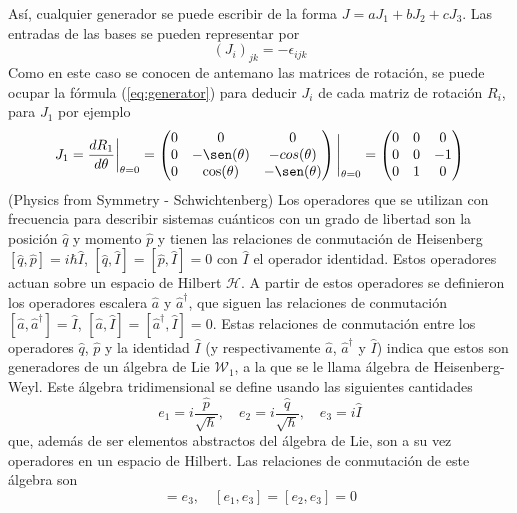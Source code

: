 Así, cualquier generador se puede escribir de la forma $J = aJ_1+ bJ_2+cJ_3$. Las entradas de las bases se pueden representar por
\begin{equation*}
  (J_i)_{jk} = -\epsilon_{ijk}
\end{equation*}
Como en este caso se conocen de antemano las matrices de rotación, se puede ocupar la fórmula (\ref{eq:generator}) para deducir $J_i$ de cada matriz de rotación $R_i$, para $J_1$ por ejemplo
\begin{equation*}
  J_1 = \frac{dR_1}{d\theta}\bigg|_{\theta=0} = \begin{pmatrix}
    0 & 0 & 0 \\ 0 & -\sen(\theta) & -cos(\theta)\\ 0 & \cos(\theta) & -\sen(\theta)
  \end{pmatrix} \Bigg|_{\theta=0} = \begin{pmatrix}
    0 & 0 & 0 \\ 0&0&-1\\ 0&1&0
  \end{pmatrix}
\end{equation*}
(Physics from Symmetry - Schwichtenberg)
Los operadores que se utilizan con frecuencia para describir sistemas cuánticos con un grado de libertad son la posición $\hat{q}$ y momento $\hat{p}$ y tienen las relaciones de conmutación de Heisenberg $[\hat{q}, \hat{p}] = i\hbar \hat{I}$, $[\hat{q}, \hat{I}] = [\hat{p}, \hat{I}]=0$ con $\hat{I}$ el operador identidad. Estos operadores actuan sobre un espacio de Hilbert $\mathcal{H}$. A partir de estos operadores se definieron los operadores escalera $\hat{a}$ y $\hat{a}^{\dagger}$, que siguen las relaciones de conmutación $[\hat{a}, \hat{a}^{\dagger}] = \hat{I}$, $[\hat{a}, \hat{I}]=[\hat{a}^{\dagger}, \hat{I}] = 0$. Estas relaciones de conmutación entre los operadores $\hat{q}$, $\hat{p}$ y la identidad $\hat{I}$ (y respectivamente $\hat{a}$, $\hat{a}^{\dagger}$ y $\hat{I}$) indica que estos son generadores de un álgebra de Lie $\mathcal{W}_1$, a la que se le llama álgebra de Heisenberg-Weyl. Este álgebra tridimensional se define usando las siguientes cantidades
\begin{equation*}
  e_1 = i\frac{\hat{p}}{\sqrt{\hbar}}, \quad e_2 = i\frac{\hat{q}}{\sqrt{\hbar}}, \quad e_3 = i\hat{I}
\end{equation*}
que, además de ser elementos abstractos del álgebra de Lie, son a su vez operadores en un espacio de Hilbert. Las relaciones de conmutación de este álgebra son
\begin{equation*}
  [e_1, e_2] = e_3, \quad [e_1, e_3] = [e_2, e_3] = 0
\end{equation*}
